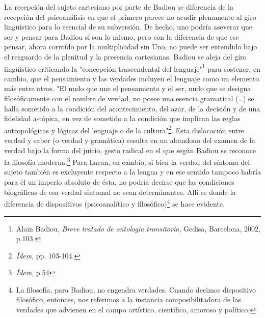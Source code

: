 \documentclass{book}
\begin{document}
La recepción del sujeto cartesiano por parte de Badiou se diferencia de
la recepción del psicoanálisis en que el primero parece no acudir
plenamente al giro lingüístico para lo esencial de su subversión. De
hecho, uno podría aseverar que ser y pensar para Badiou sí son lo mismo,
pero con la diferencia de que ese pensar, ahora corroído por la
multiplicidad sin Uno, no puede ser entendido bajo el resguardo de la
plenitud y la presencia cartesianas. Badiou se aleja del giro
lingüístico criticando la "concepción trascendental del
lenguaje"\footnote{Alain Badiou, \emph{Breve tratado de ontología
  transitoria}, Gedisa, Barcelona, 2002, p.103.} para sostener, en
cambio, que el pensamiento y las verdades incluyen el lenguaje como un
elemento más entre otros. "El nudo que une el pensamiento y el ser, nudo
que se designa filosóficamente con el nombre de verdad, no posee una
esencia gramatical (\ldots) se halla sometido a la condición del
acontecimiento, del azar, de la decisión y de una fidelidad a-tópica, en
vez de sometido a la condición que implican las reglas antropológicas y
lógicas del lenguaje o de la cultura"\footnote{\emph{Ídem}, pp. 103-104.}.
Esta dislocación entre verdad y saber (o verdad y gramática) resulta en
un abandono del examen de la verdad bajo la forma del juicio, gesto
radical en el que según Badiou se reconoce la filosofía
moderna.\footnote{\emph{Ídem}, p.54} Para Lacan, en cambio, si bien la
verdad del síntoma del sujeto también es excluyente respecto a la lengua
y en ese sentido tampoco habría para él un imperio absoluto de ésta, no
podría decirse que las condiciones biográficas de esa verdad sintomal no
sean determinantes. Allí es donde la diferencia de dispositivos
(psicoanalítico y filosófico)\footnote{La filosofía, para Badiou, no
  engendra verdades. Cuando decimos dispositivo filosófico, entonces,
  nos referimos a la instancia composibilitadora de las verdades que
  advienen en el campo artístico, científico, amoroso y político.} se
hace evidente.
\end{document}
